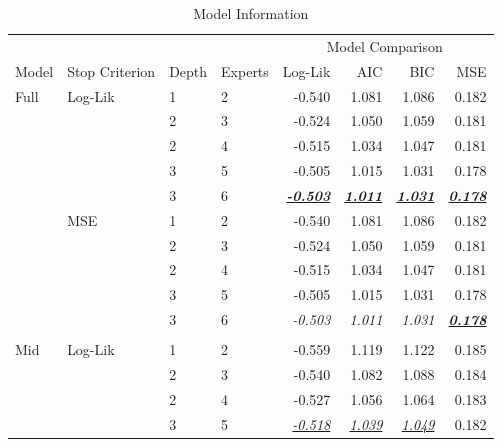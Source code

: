 \documentclass[12pt]{article}
\begin{document}
\newcommand\ti{\textit}
\newcommand{\iu}[1]{\underline{\textit{#1}}}
\newcommand{\ibu}[1]{\textbf{\underline{\textit{#1}}}}
\newcommand\T{\rule{0pt}{2.5ex}}       %
\newcommand\B{\rule[-1.2ex]{0pt}{0pt}} %
\begin{table} \centering
  \caption{Model Information}
  \begin{threeparttable}
    \begin{tabular}[r]{l l l l r r r r}
  \cmidrule{1-8}
        &            &        &         &  \multicolumn{4}{c}{Model Comparison} \\ 
   \cmidrule(l){5-8}
Model   & Stop Criterion  &  Depth & Experts & Log-Lik & AIC    & BIC    & MSE   \\ 
  \cmidrule{1-8}


Full    &  Log-Lik   &   1    &    2    & -0.540  & 1.081  & 1.086  & 0.182 \\
        &            &   2    &    3    & -0.524  & 1.050  & 1.059  & 0.181 \\
        &            &   2    &    4    & -0.515  & 1.034  & 1.047  & 0.181 \\
        &            &   3    &    5    & -0.505  & 1.015  & 1.031  & 0.178 \\
        &            &   3    &    6    & \ibu{-0.503}  & \ibu{1.011}  & \ibu{1.031}  & \ibu{0.178} \\ \T 
        &  MSE       &   1    &    2    & -0.540  & 1.081  & 1.086  & 0.182 \\
        &            &   2    &    3    & -0.524  & 1.050  & 1.059  & 0.181 \\
        &            &   2    &    4    & -0.515  & 1.034  & 1.047  & 0.181 \\
        &            &   3    &    5    & -0.505  & 1.015  & 1.031  & 0.178 \\
        &            &   3    &    6    & \ti{-0.503}  & \ti{1.011}  & \ti{1.031}  & \ibu{0.178} \\ \T \\
        \cmidrule(l){1-8}
Mid     &  Log-Lik   &   1    &    2    & -0.559  & 1.119  & 1.122  & 0.185 \\
        &            &   2    &    3    & -0.540  & 1.082  & 1.088  & 0.184 \\
        &            &   2    &    4    & -0.527  & 1.056  & 1.064  & 0.183 \\
        &            &   3    &    5    & \iu{-0.518}  & \iu{1.039}  & \iu{1.049}  & 0.182 \\

\end{tabular}
\end{threeparttable}
\end{table}
\end{document}
